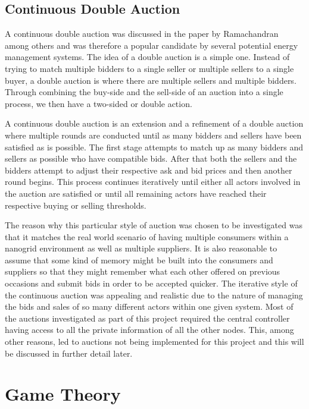 \documentclass[a4paper, notitlepage]{report}
\begin{document}
\section{Continuous Double Auction}
\label{sec:orgfb2470b}
A continuous double auction was discussed in the paper by Ramachandran
\cite{ramachandran2011intelligent} among others and was therefore a popular
candidate by several potential energy management systems. The idea of a double
auction is a simple one. Instead of trying to match multiple bidders to a single
seller or multiple sellers to a single buyer, a double auction is where there
are multiple sellers and multiple bidders. Through combining the buy-side and
the sell-side of an auction into a single process, we then have a two-sided or
double action. 

A continuous double auction is an extension and a refinement of a double auction
where multiple rounds are conducted until as many bidders and sellers have been
satisfied as is possible. The first stage attempts to match up as many bidders
and sellers as possible who have compatible bids. After that both the sellers
and the bidders attempt to adjust their respective ask and bid prices and then
another round begins. This process continues iteratively until either all actors
involved in the auction are satisfied or until all remaining actors have reached
their respective buying or selling thresholds. 

The reason why this particular style of auction was chosen to be investigated
was that it matches the real world scenario of having multiple consumers within
a nanogrid environment as well as multiple suppliers. It is also reasonable to
assume that some kind of memory might be built into the consumers and suppliers
so that they might remember what each other offered on previous occasions and
submit bids in order to be accepted quicker. The iterative style of the
continuous auction was appealing and realistic due to the nature of managing the
bids and sales of so many different actors within one given system. Most of the
auctions investigated as part of this project required the central controller
having access to all the private information of all the other nodes. This, among
other reasons, led to auctions not being implemented for this project and this
will be discussed in further detail later.
\chapter{Game Theory}
\label{sec:orga079305}
\end{document}
